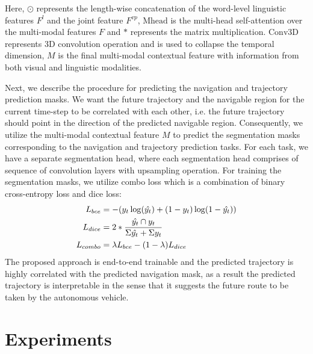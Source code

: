 \documentclass[letterpaper, 10 pt, conference]{ieeeconf}  %
\begin{document}
Here, $\odot$ represents the length-wise concatenation of the word-level linguistic features $F^l$ and the joint feature $F^{vp}$, $\text{Mhead}$ is the multi-head self-attention over the multi-modal features $F$ and $\ast$ represents the matrix multiplication. $\text{Conv3D}$ represents 3D convolution operation and is used to collapse the temporal dimension, $M$ is the final multi-modal contextual feature with information from both visual and linguistic modalities.

Next, we describe the procedure for predicting the navigation and trajectory prediction masks. We want the future trajectory and the navigable region for the current time-step to be correlated with each other, i.e. the future trajectory should point in the direction of the predicted navigable region. Consequently, we utilize the multi-modal contextual feature $M$ to predict the segmentation masks corresponding to the navigation and trajectory prediction tasks. For each task, we have a separate segmentation head, where each segmentation head comprises of sequence of convolution layers with upsampling operation. For training the segmentation masks, we utilize combo loss \cite{taghanaki2019combo} which is a combination of binary cross-entropy loss and dice loss:
\begin{equation} \label{eq2}
\begin{split}
    L_{bce} &= -{(y_{t}\log(\hat{y_{t}}) + (1 - y_{t})\log(1 - \hat{y_{t}}))}\\
    L_{dice} &= 2 * \frac{\hat{y_{t}} \cap y_{t}}{\Sigma{\hat{y_{t}}} + \Sigma{y_{t}}}\\        L_{combo} &= \lambda L_{bce} - (1 - \lambda) L_{dice}
\end{split}
\raisetag{3\normalbaselineskip}
\end{equation}
The proposed approach is end-to-end trainable and the predicted trajectory is highly correlated with the predicted navigation mask, as a result the predicted trajectory is interpretable in the sense that it suggests the future route to be taken by the autonomous vehicle.


\section{Experiments}
\end{document}
